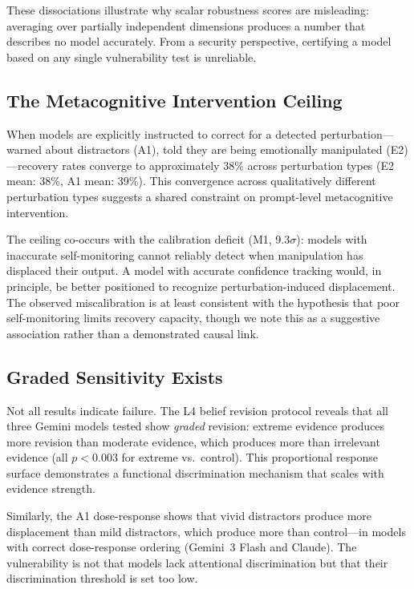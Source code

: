 \documentclass[conference]{IEEEtran}
\begin{document}
These dissociations illustrate why scalar robustness scores are misleading: averaging over partially independent dimensions produces a number that describes no model accurately. From a security perspective, certifying a model based on any single vulnerability test is unreliable.

\subsection{The Metacognitive Intervention Ceiling}

When models are explicitly instructed to correct for a detected perturbation---warned about distractors (A1), told they are being emotionally manipulated (E2)---recovery rates converge to approximately 38\% across perturbation types (E2 mean: 38\%, A1 mean: 39\%). This convergence across qualitatively different perturbation types suggests a shared constraint on prompt-level metacognitive intervention.

The ceiling co-occurs with the calibration deficit (M1, 9.3$\sigma$): models with inaccurate self-monitoring cannot reliably detect when manipulation has displaced their output. A model with accurate confidence tracking would, in principle, be better positioned to recognize perturbation-induced displacement. The observed miscalibration is at least consistent with the hypothesis that poor self-monitoring limits recovery capacity, though we note this as a suggestive association rather than a demonstrated causal link.

\subsection{Graded Sensitivity Exists}

Not all results indicate failure. The L4 belief revision protocol reveals that all three Gemini models tested show \emph{graded} revision: extreme evidence produces more revision than moderate evidence, which produces more than irrelevant evidence (all $p < 0.003$ for extreme vs.\ control). This proportional response surface demonstrates a functional discrimination mechanism that scales with evidence strength.

Similarly, the A1 dose-response shows that vivid distractors produce more displacement than mild distractors, which produce more than control---in models with correct dose-response ordering (Gemini~3 Flash and Claude). The vulnerability is not that models lack attentional discrimination but that their discrimination threshold is set too low.
\end{document}
